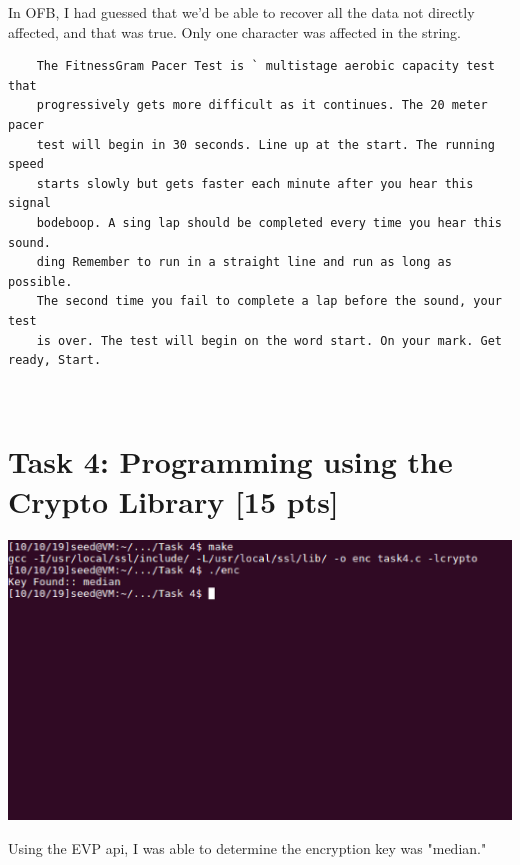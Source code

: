 \documentclass{article}
\begin{document}
In OFB, I had guessed that we'd be able to recover all the data not directly affected, and that was true.  Only one character was affected in the string.
\begin{verbatim}
    The FitnessGram Pacer Test is ` multistage aerobic capacity test that 
    progressively gets more difficult as it continues. The 20 meter pacer 
    test will begin in 30 seconds. Line up at the start. The running speed 
    starts slowly but gets faster each minute after you hear this signal 
    bodeboop. A sing lap should be completed every time you hear this sound. 
    ding Remember to run in a straight line and run as long as possible. 
    The second time you fail to complete a lap before the sound, your test 
    is over. The test will begin on the word start. On your mark. Get ready, Start.
\end{verbatim}\\

\section{Task 4: Programming using the Crypto Library [15 pts]}
\begin{center}
    \includegraphics[scale=0.5]{task4.png}
\end{center}
Using the EVP api, I was able to determine the encryption key was "median."
\end{document}
